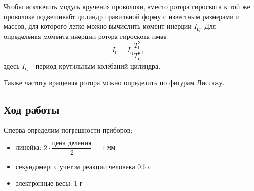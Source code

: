 \documentclass[a4paper,12pt]{article}
\begin{document}
Чтобы исключить модуль кручения проволоки, вместо ротора гироскопа к той же проволоке подвешивабт цилиндр правильной форму с известным размерами и массов, для которого легко можно вычислить момент инерции $I_{\text{ц}}$. Для определения момента инерции ротора гироскопа имее \[ I_0 = I_{\text{ц}}\frac{T_0^2}{T_{\text{ц}}^2}, \]
здесь $I_{\text{ц}}$ -- период крутильным колебаний цилиндра.

Также частоту вращения ротора можно определить по фигурам Лиссажу.

\subsection*{Ход работы}
Сперва определим погрешности приборов:
\begin{itemize}
	\item линейка: $2\cdot\dfrac{\text{цена деления}}{2} = 1$ мм
	\item секундомер: с учетом реакции человека $0.5$ с
	\item электронные весы: $1$ г
\end{itemize}
\end{document}
